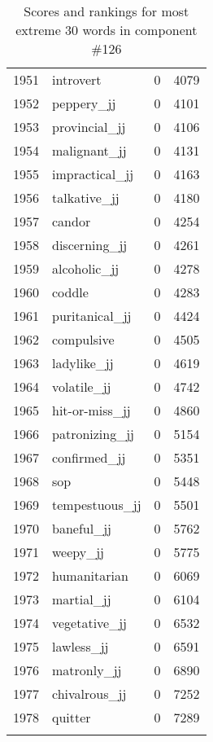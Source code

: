 \begin{longtable}[!htbp]{| rlr@{.}l |}
    1951 & introvert & 0 & 4079 \\
    1952 & peppery\_jj & 0 & 4101 \\
    1953 & provincial\_jj & 0 & 4106 \\
    1954 & malignant\_jj & 0 & 4131 \\
    1955 & impractical\_jj & 0 & 4163 \\
    1956 & talkative\_jj & 0 & 4180 \\
    1957 & candor & 0 & 4254 \\
    1958 & discerning\_jj & 0 & 4261 \\
    1959 & alcoholic\_jj & 0 & 4278 \\
    1960 & coddle & 0 & 4283 \\
    1961 & puritanical\_jj & 0 & 4424 \\
    1962 & compulsive & 0 & 4505 \\
    1963 & ladylike\_jj & 0 & 4619 \\
    1964 & volatile\_jj & 0 & 4742 \\
    1965 & hit-or-miss\_jj & 0 & 4860 \\
    1966 & patronizing\_jj & 0 & 5154 \\
    1967 & confirmed\_jj & 0 & 5351 \\
    1968 & sop & 0 & 5448 \\
    1969 & tempestuous\_jj & 0 & 5501 \\
    1970 & baneful\_jj & 0 & 5762 \\
    1971 & weepy\_jj & 0 & 5775 \\
    1972 & humanitarian & 0 & 6069 \\
    1973 & martial\_jj & 0 & 6104 \\
    1974 & vegetative\_jj & 0 & 6532 \\
    1975 & lawless\_jj & 0 & 6591 \\
    1976 & matronly\_jj & 0 & 6890 \\
    1977 & chivalrous\_jj & 0 & 7252 \\
    1978 & quitter & 0 & 7289 \\
    \hline
    \caption{Scores and rankings for most extreme 30 words in component \#126} \\
\end{longtable}
